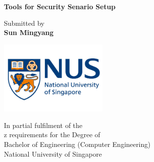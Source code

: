 \documentclass[12pt]{report}
\begin{document}
\begin{titlepage}
	\begin{center}
		\vspace*{0.5cm}

		{\LARGE\textbf{Tools for Security Senario Setup}}
 
		\vspace{5cm}
 
 		Submitted by\\
		\textbf{Sun Mingyang}
 
		\vfill
 
		\includegraphics[width=0.4\textwidth]{./pictures/nus-logo}
 
		In partial fulfilment of the\\	z
		requirements for the Degree of\\
		Bachelor of Engineering (Computer Engineering)\\
		National University of Singapore\\

	\end{center}
\end{titlepage}
\end{document}
